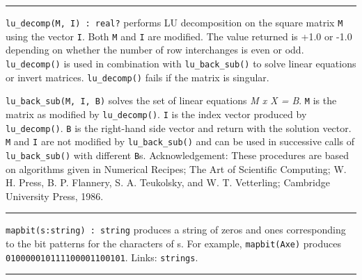 \vspace{0.25cm}\hrule{}

\texttt{lu\_decomp(M, I) : real?} performs LU
decomposition on the square matrix \texttt{M} using the vector
\texttt{I}. Both \texttt{M} and \texttt{I} are modified. The value
returned is +1.0 or -1.0 depending on whether the number of row
interchanges is even or odd. \texttt{lu\_decomp()} is used in
combination with \texttt{lu\_back\_sub()} to solve linear equations or
invert matrices. \texttt{lu\_decomp()} fails if the matrix is singular.

\texttt{lu\_back\_sub(M, I, B)} solves the set of linear equations
\textit{M x X = B}. \texttt{M} is the matrix as modified by
\texttt{lu\_decomp()}. \texttt{I} is the index vector produced by
\texttt{lu\_decomp()}. \texttt{B} is the right-hand side vector and
return with the solution vector. \texttt{M} and \texttt{I} are not
modified by \texttt{lu\_back\_sub()} and can be used in successive
calls of \texttt{lu\_back\_sub()} with different \texttt{B}s.
Acknowledgement: These procedures are based on algorithms given in
{\textquotedbl}Numerical Recipes; The Art of Scientific
Computing{\textquotedbl}; W. H. Press, B. P. Flannery, S. A.
Teukolsky, and W. T. Vetterling; Cambridge University Press, 1986.


\vspace{0.25cm}\hrule{}

\texttt{mapbit(s:string) : string} produces a string of zeros and ones
corresponding to the bit patterns for the characters of s. For example,
\texttt{mapbit({\textquotedbl}Axe{\textquotedbl})} produces
\texttt{{\textquotedbl}010000010111100001100101{\textquotedbl}}. Links:
\texttt{strings}. 

\vspace{0.25cm}\hrule{}

